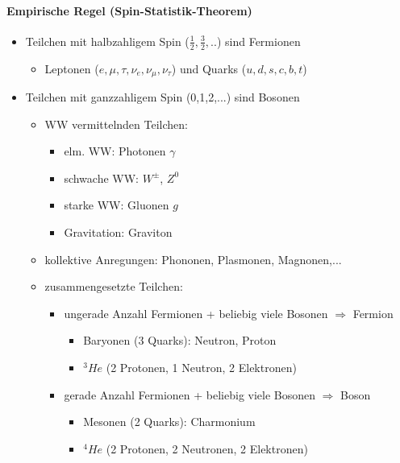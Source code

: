 \paragraph{Empirische Regel (Spin-Statistik-Theorem)}
\begin{itemize}
    \item Teilchen mit halbzahligem Spin ($\frac{1}{2},\frac{3}{2},..$) sind Fermionen
    \begin{itemize}
        \item Leptonen ($e,\mu,\tau,\nu_e,\nu_{\mu},\nu_{\tau}$) und Quarks ($u,d,s,c,b,t$)
    \end{itemize}
    \item Teilchen mit ganzzahligem Spin (0,1,2,...) sind Bosonen
    \begin{itemize}
        \item WW vermittelnden Teilchen:
        \begin{itemize}
            \item[] elm. WW: Photonen $\gamma$
            \item[] schwache WW: $W^{\pm}$, $Z^0$
            \item[] starke WW: Gluonen $g$
            \item[] Gravitation: Graviton 
        \end{itemize}
        \item kollektive Anregungen: Phononen, Plasmonen, Magnonen,...
        \item zusammengesetzte Teilchen:
        \begin{itemize}
            \item ungerade Anzahl Fermionen + beliebig viele Bosonen $\Rightarrow$ Fermion
            \begin{itemize}
                \item[] Baryonen (3 Quarks): Neutron, Proton
                \item[] $^3He$ (2 Protonen, 1 Neutron, 2 Elektronen) 
            \end{itemize}
            \item gerade Anzahl Fermionen + beliebig viele Bosonen $\Rightarrow$ Boson
            \begin{itemize}
                \item[] Mesonen (2 Quarks): Charmonium
                \item[] $^4He$ (2 Protonen, 2 Neutronen, 2 Elektronen) 
            \end{itemize}
        \end{itemize}
    \end{itemize}
\end{itemize}

